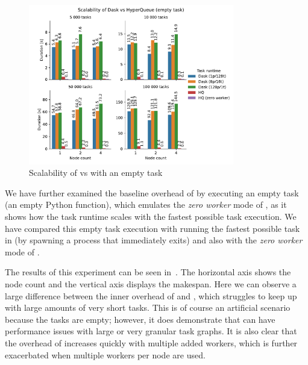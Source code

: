 \begin{figure}[h]
	\centering
	\includegraphics[width=0.8\textwidth]{imgs/hq/charts/dask-vs-hq-empty}
	\caption{Scalability of \hyperqueue{} vs \dask{} with an empty task}
	\label{fig:hq-dask-empty}
\end{figure}

We have further examined the baseline overhead of \dask{} by executing an empty
task (an empty Python function), which emulates the \emph{zero worker} mode of
\hyperqueue{}, as it shows how the task runtime scales with the fastest possible task
execution. We have compared this empty task execution with running the fastest possible task in
\hyperqueue{} (by spawning a process that immediately exits) and also with the \emph{zero worker} mode of \hyperqueue{}.

The results of this experiment can be seen in~. The horizontal axis shows
the node count and the vertical axis displays the makespan. Here we can observe a large difference
between the inner overhead of \hyperqueue{} and \dask{}, which struggles
to keep up with large amounts of very short tasks. This is of course an artificial scenario because
the tasks are empty; however, it does demonstrate that \dask{} can have
performance issues with large or very granular task graphs. It is also clear that the overhead of
\dask{} increases quickly with multiple added workers, which is further exacerbated
when multiple workers per node are used.


